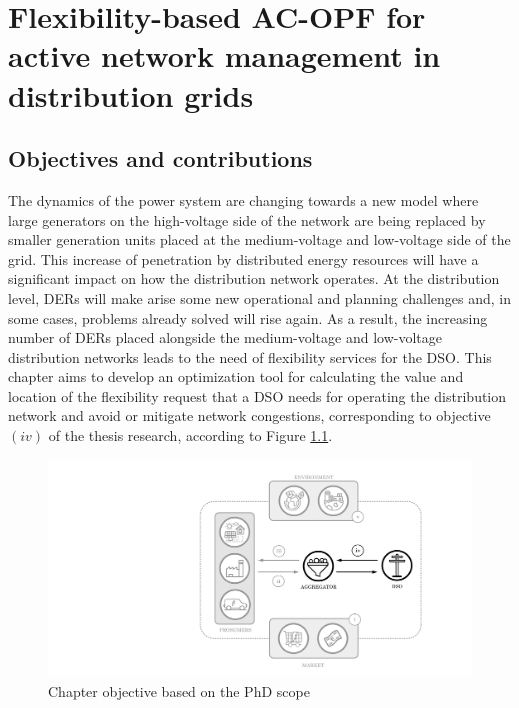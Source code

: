 \chapter{Flexibility-based AC-OPF for active network management in distribution grids}
\label{ChapterOPFDSO}

\section{Objectives and contributions}

The dynamics of the power system are changing towards a new model where large generators on the high-voltage side of the network are being replaced by smaller generation units placed at the medium-voltage and low-voltage side of the grid. This increase of penetration by distributed energy resources will have a significant impact on how the distribution network operates. At the distribution level, DERs will make arise some new operational and planning challenges and, in some cases, problems already solved will rise again. As a result, the increasing number of DERs placed alongside the medium-voltage  and low-voltage distribution networks leads to the need of flexibility services for the DSO. 
This chapter aims to develop an optimization tool for calculating the value and location of the flexibility request that a DSO needs for operating the distribution network and avoid or mitigate network congestions, corresponding to objective $(iv)$ of the thesis research, according to Figure \ref{fig:chapter_obj_iv}. 

\begin{figure}[htbp]
	\centering
	\includegraphics[width=0.7\columnwidth ]{ChapterOPF_DSO/Figures/phd_intro_iv.pdf}
		\caption{Chapter objective based on the PhD scope}
	\label{fig:chapter_obj_iv}  
\end{figure}


